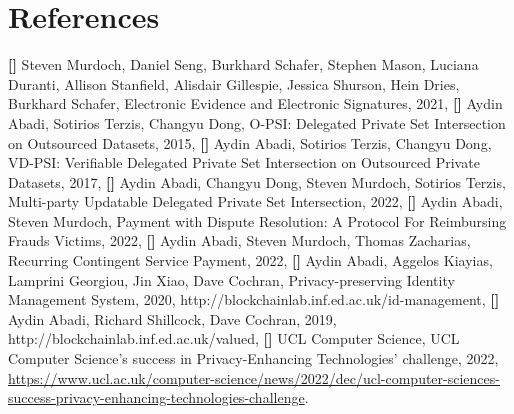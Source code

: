 




\section*{References}


%
\textbf{[\y]} Steven Murdoch, Daniel Seng, Burkhard Schafer, Stephen Mason, Luciana Duranti, Allison Stanfield, Alisdair Gillespie,  Jessica Shurson, Hein Dries, Burkhard Schafer, Electronic Evidence and Electronic Signatures, 2021, \textbf{[\y]} Aydin Abadi, Sotirios Terzis, Changyu Dong, O-PSI: Delegated Private Set Intersection on Outsourced Datasets, 2015, \textbf{[\y]} Aydin Abadi, Sotirios Terzis, Changyu Dong, VD-PSI: Verifiable Delegated Private Set Intersection on Outsourced Private Datasets, 2017, \textbf{[\y]} Aydin Abadi, Changyu Dong, Steven Murdoch, Sotirios Terzis, Multi-party Updatable Delegated Private Set Intersection, 2022, \textbf{[\y]} Aydin Abadi, Steven Murdoch, Payment with Dispute Resolution:
A Protocol For Reimbursing Frauds Victims, 2022, \textbf{[\y]} Aydin Abadi, Steven Murdoch, Thomas Zacharias, Recurring Contingent Service Payment, 2022, \textbf{[\y]} Aydin Abadi, Aggelos Kiayias, Lamprini Georgiou, Jin Xiao, Dave Cochran, Privacy-preserving Identity Management System, 2020, http://blockchainlab.inf.ed.ac.uk/id-management, \textbf{[\y]} Aydin Abadi, Richard Shillcock, Dave Cochran, 2019, http://blockchainlab.inf.ed.ac.uk/valued, \textbf{[\y]} UCL Computer Science, UCL Computer Science's success in Privacy-Enhancing Technologies' challenge, 2022, \href{https://www.ucl.ac.uk/computer-science/news/2022/dec/ucl-computer-sciences-success-privacy-enhancing-technologies-challenge}{https://www.ucl.ac.uk/computer-science/news/2022/dec/ucl-computer-sciences-success-privacy-enhancing-technologies-challenge}. 





